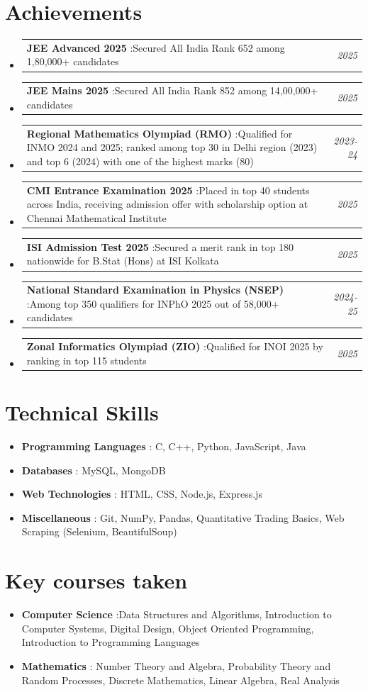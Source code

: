 \documentclass[a4paper,11pt]{article}
\makeatletter
\newcommand{\resumeItem}[2]{
  \item{
    \textbf{#1}{ :\hspace{0.5mm}#2 \vspace{-0.5mm}}
  }
}
\newcommand{\resumeAchievement}[3]{
\vspace{0.5mm}\item
    \begin{tabular*}{0.97\textwidth}[t]{l@{\extracolsep{\fill}}r}
        \textbf{#1} :\hspace{0.3mm}#2 & \textit{\small{#3}} 
    \end{tabular*}
    \vspace{-2mm}
}
\newcommand{\resumeSubItem}[2]{\resumeItem{#1} {#2}\vspace{-4pt}}
\newcommand{\resumeSubHeadingListStart}{\begin{itemize}[leftmargin=*,labelsep=0mm]}
\newcommand{\resumeHeadingSkillStart}{\begin{itemize}[leftmargin=*,itemsep=1.7mm, rightmargin=2ex]}
\newcommand{\resumeSubHeadingListEnd}{\end{itemize}\vspace{2mm}}
\newcommand{\resumeHeadingSkillEnd}{\end{itemize}\vspace{-2mm}}
\makeatother
\begin{document}
\section{Achievements}
\vspace{-0.5mm}
\resumeSubHeadingListStart
\resumeAchievement{JEE Advanced 2025}
    {Secured All India Rank 652 among 1,80,000+ candidates}
    {2025}
\resumeAchievement{JEE Mains 2025}
    {Secured All India Rank 852 among 14,00,000+ candidates}
    {2025}
\resumeAchievement{Regional Mathematics Olympiad (RMO)}
    {Qualified for INMO 2024 and 2025; ranked among top 30 in Delhi region (2023) and top 6 (2024) with one of the highest marks (80)}
    {2023-24}
\resumeAchievement{CMI Entrance Examination 2025}
    {Placed in top 40 students across India, receiving admission offer with scholarship option at Chennai Mathematical Institute}
    {2025}
\resumeAchievement{ISI Admission Test 2025}
    {Secured a merit rank in top 180 nationwide for B.Stat (Hons) at ISI Kolkata}
    {2025}
\resumeAchievement{National Standard Examination in Physics (NSEP)}
    {Among top 350 qualifiers for INPhO 2025 out of 58,000+ candidates}
    {2024-25}
\resumeAchievement{Zonal Informatics Olympiad (ZIO)}
    {Qualified for INOI 2025 by ranking in top 115 students}
    {2025}
\resumeSubHeadingListEnd
\vspace{-5.5mm}

\section{Technical Skills}
\vspace{-0.2mm}
 \resumeHeadingSkillStart
  \resumeSubItem{Programming Languages} %
    { C, C++, Python, JavaScript, Java }
  \resumeSubItem{Databases}
    { MySQL, MongoDB }
  \resumeSubItem{Web Technologies}
    { HTML, CSS, Node.js, Express.js }
  \resumeSubItem{Miscellaneous}
    { Git, NumPy, Pandas, Quantitative Trading Basics, Web Scraping (Selenium, BeautifulSoup) }
     \vspace{1mm}
 \resumeHeadingSkillEnd
\vspace{-2mm}

\section{Key courses taken}
\resumeHeadingSkillStart
\resumeSubItem{Computer Science}
    {Data Structures and Algorithms, Introduction to Computer Systems, Digital Design, Object Oriented Programming, Introduction to Programming Languages}
 \resumeSubItem{Mathematics} %
    { Number Theory and Algebra, Probability Theory and Random Processes, Discrete Mathematics, Linear Algebra, Real Analysis}
 \resumeHeadingSkillEnd
 \vspace{1mm}
\vspace{-5mm}
\end{document}
